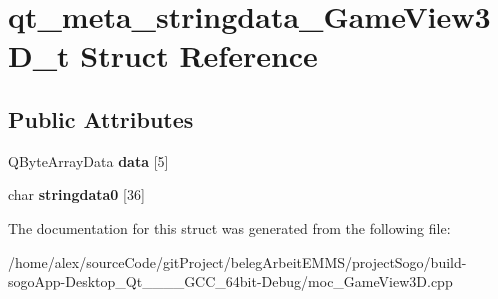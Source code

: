 \hypertarget{structqt__meta__stringdata__GameView3D__t}{\section{qt\-\_\-meta\-\_\-stringdata\-\_\-\-Game\-View3\-D\-\_\-t Struct Reference}
\label{structqt__meta__stringdata__GameView3D__t}
}
\subsection*{Public Attributes}
\begin{DoxyCompactItemize}
\item 
\hypertarget{structqt__meta__stringdata__GameView3D__t_ac9ae06cfb9261a036fd79897bb736f42}{Q\-Byte\-Array\-Data {\bfseries data} \mbox{[}5\mbox{]}}\label{structqt__meta__stringdata__GameView3D__t_ac9ae06cfb9261a036fd79897bb736f42}

\item 
\hypertarget{structqt__meta__stringdata__GameView3D__t_a28f6ac1b861197bcc3e10575bf5c6460}{char {\bfseries stringdata0} \mbox{[}36\mbox{]}}\label{structqt__meta__stringdata__GameView3D__t_a28f6ac1b861197bcc3e10575bf5c6460}

\end{DoxyCompactItemize}


The documentation for this struct was generated from the following file\-:\begin{DoxyCompactItemize}
\item 
/home/alex/source\-Code/git\-Project/beleg\-Arbeit\-E\-M\-M\-S/project\-Sogo/build-\/sogo\-App-\/\-Desktop\-\_\-\-Qt\-\_\-\_\-\_\-\_\-\-G\-C\-C\-\_\-64bit-\/\-Debug/moc\-\_\-\-Game\-View3\-D.\-cpp\end{DoxyCompactItemize}
